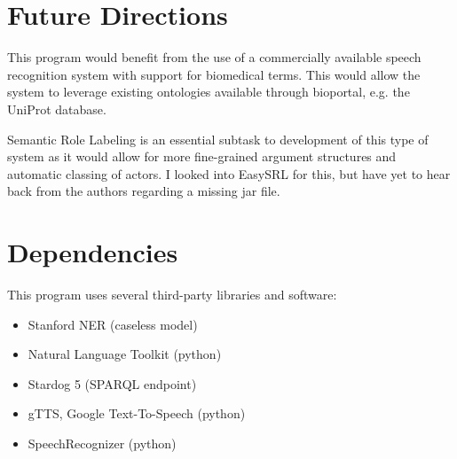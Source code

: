\documentclass[11pt]{article}
\begin{document}
\section{Future Directions}
This program would benefit from the use of a commercially available speech recognition system with support for biomedical terms. This would allow the system to leverage existing ontologies available through bioportal, e.g. the UniProt database.

Semantic Role Labeling is an essential subtask to development of this type of system as it would allow for more fine-grained argument structures and automatic classing of actors. I looked into EasySRL for this, but have yet to hear back from the authors regarding a missing jar file.\cite{lewis2015}

\section{Dependencies}
This program uses several third-party libraries and software:
\begin{itemize}
\item Stanford NER (caseless model)
\item Natural Language Toolkit (python)
\item Stardog 5 (SPARQL endpoint)
\item gTTS, Google Text-To-Speech (python)
\item SpeechRecognizer (python)

\end{itemize}



\end{document}
